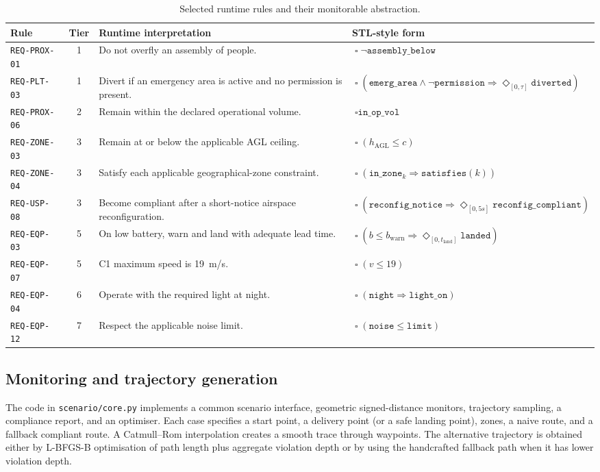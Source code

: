 \documentclass[11pt,a4paper]{article}
\newcommand{\always}{\mathop{\square}}
\newcommand{\eventually}{\mathop{\Diamond}}
\newcommand{\ruleid}[1]{\texttt{#1}}
\begin{document}
\begin{table}[htbp]
\centering
\caption{Selected runtime rules and their monitorable abstraction.}
\label{tab:selected-rules}
\small
\begin{tabularx}{\linewidth}{@{}l c Y Y@{}}
\toprule
Rule & Tier & Runtime interpretation & STL-style form \\
\midrule
\ruleid{REQ-PROX-01} & 1 & Do not overfly an assembly of people. & $\always\neg\texttt{assembly\_below}$ \\
\ruleid{REQ-PLT-03} & 1 & Divert if an emergency area is active and no permission is present. & $\always(\texttt{emerg\_area}\wedge\neg\texttt{permission}\Rightarrow\eventually_{[0,\tau]}\texttt{diverted})$ \\
\ruleid{REQ-PROX-06} & 2 & Remain within the declared operational volume. & $\always\texttt{in\_op\_vol}$ \\
\ruleid{REQ-ZONE-03} & 3 & Remain at or below the applicable AGL ceiling. & $\always(h_{\mathrm{AGL}}\leq c)$ \\
\ruleid{REQ-ZONE-04} & 3 & Satisfy each applicable geographical-zone constraint. & $\always(\texttt{in\_zone}_k\Rightarrow\texttt{satisfies}(k))$ \\
\ruleid{REQ-USP-08} & 3 & Become compliant after a short-notice airspace reconfiguration. & $\always(\texttt{reconfig\_notice}\Rightarrow\eventually_{[0,5s]}\texttt{reconfig\_compliant})$ \\
\ruleid{REQ-EQP-03} & 5 & On low battery, warn and land with adequate lead time. & $\always(b\leq b_\mathrm{warn}\Rightarrow\eventually_{[0,t_\mathrm{land}]}\texttt{landed})$ \\
\ruleid{REQ-EQP-07} & 5 & C1 maximum speed is 19~m/s. & $\always(v\leq19)$ \\
\ruleid{REQ-EQP-04} & 6 & Operate with the required light at night. & $\always(\texttt{night}\Rightarrow\texttt{light\_on})$ \\
\ruleid{REQ-EQP-12} & 7 & Respect the applicable noise limit. & $\always(\texttt{noise}\leq\texttt{limit})$ \\
\bottomrule
\end{tabularx}
\end{table}

\subsection{Monitoring and trajectory generation}

The code in \texttt{scenario/core.py} implements a common scenario interface, geometric signed-distance monitors, trajectory sampling, a compliance report, and an optimiser. Each case specifies a start point, a delivery point (or a safe landing point), zones, a naive route, and a fallback compliant route. A Catmull--Rom interpolation creates a smooth trace through waypoints. The alternative trajectory is obtained either by L-BFGS-B optimisation of path length plus aggregate violation depth or by using the handcrafted fallback path when it has lower violation depth.
\end{document}
